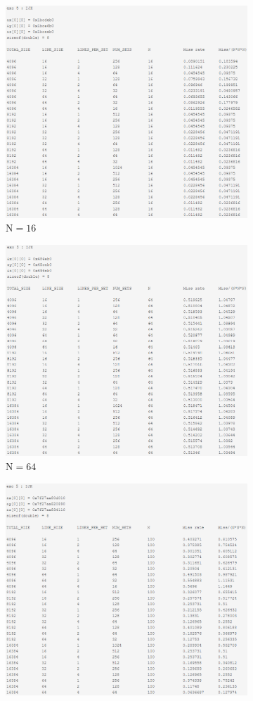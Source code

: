 \documentclass[12pt]{base}
\begin{document}
\begin{figure}[H]
\begin{subfigure}[H]{0.5\linewidth}
    \centering
    \includegraphics[width=0.75\linewidth]{3_ijk_16.png}
    \caption{$\text{N}=16$}
    \label{fig:3_16}
\end{subfigure}
\begin{subfigure}[H]{0.5\linewidth}
    \centering
    \includegraphics[width=0.75\linewidth]{3_ijk_64.png}
    \caption{$\text{N}=64$}
    \label{fig:3_64}
\end{subfigure}\par\bigskip
\begin{subfigure}[H]{0.5\linewidth}
    \centering
    \includegraphics[width=0.75\linewidth]{3_ijk_100.png}

\end{subfigure}
\end{figure}
\end{document}
